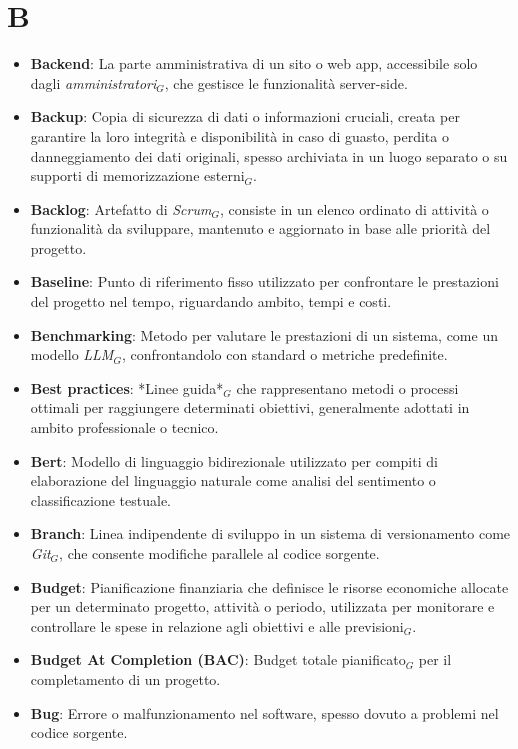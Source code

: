 \section{B}
\begin{itemize}
    \item \textbf{Backend}: La parte amministrativa di un sito o web app, accessibile solo dagli \textit{amministratori}$_G$, che gestisce le funzionalità server-side.
    \item \textbf{Backup}: Copia di sicurezza di dati o informazioni cruciali, creata per garantire la loro integrità e disponibilità in caso di guasto, perdita o danneggiamento dei dati originali, spesso archiviata in un luogo separato o su supporti di memorizzazione esterni$_G$.
    \item \textbf{Backlog}: Artefatto di \textit{Scrum}$_G$, consiste in un elenco ordinato di attività o funzionalità da sviluppare, mantenuto e aggiornato in base alle priorità del progetto.
    \item \textbf{Baseline}: Punto di riferimento fisso utilizzato per confrontare le prestazioni del progetto nel tempo, riguardando ambito, tempi e costi.
    \item \textbf{Benchmarking}: Metodo per valutare le prestazioni di un sistema, come un modello \textit{LLM}$_G$, confrontandolo con standard o metriche predefinite.
    \item \textbf{Best practices}: *Linee guida*$_G$ che rappresentano metodi o processi ottimali per raggiungere determinati obiettivi, generalmente adottati in ambito professionale o tecnico.
    \item \textbf{Bert}: Modello di linguaggio bidirezionale utilizzato per compiti di elaborazione del linguaggio naturale come analisi del sentimento o classificazione testuale.
    \item \textbf{Branch}: Linea indipendente di sviluppo in un sistema di versionamento come \textit{Git}$_G$, che consente modifiche parallele al codice sorgente.
    \item \textbf{Budget}: Pianificazione finanziaria che definisce le risorse economiche allocate per un determinato progetto, attività o periodo, utilizzata per monitorare e controllare le spese in relazione agli obiettivi e alle previsioni$_G$.
    \item \textbf{Budget At Completion (BAC)}: Budget totale pianificato$_G$ per il completamento di un progetto.
    \item \textbf{Bug}: Errore o malfunzionamento nel software, spesso dovuto a problemi nel codice sorgente.
\end{itemize}
